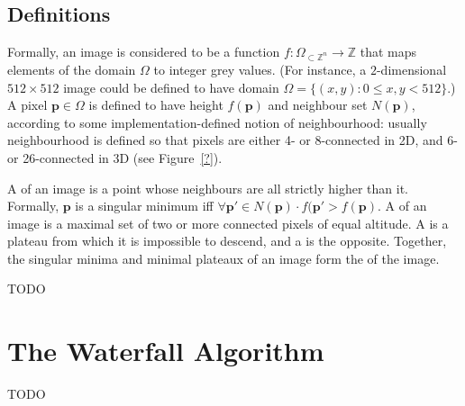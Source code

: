 \subsection{Definitions}

Formally, an image is considered to be a function $f: \Omega_{\subset \mathbb{Z}^n} \to \mathbb{Z}$ that maps elements of the domain $\Omega$ to integer grey values. (For instance, a $2$-dimensional $512 \times 512$ image could be defined to have domain $\Omega = \{(x,y) : 0 \le x,y < 512\}$.) A pixel $\mathbf{p} \in \Omega$ is defined to have height $f(\mathbf{p})$ and neighbour set $N(\mathbf{p})$, according to some implementation-defined notion of neighbourhood: usually neighbourhood is defined so that pixels are either 4- or 8-connected in 2D, and 6- or 26-connected in 3D (see Figure~\ref{?}).


A  of an image is a point whose neighbours are all strictly higher than it. Formally, $\mathbf{p}$ is a singular minimum iff $\forall \mathbf{p'} \in N(\mathbf{p}) \cdot f(\mathbf{p'} > f(\mathbf{p})$. A  of an image is a maximal set of two or more connected pixels of equal altitude. A  is a plateau from which it is impossible to descend, and a  is the opposite. Together, the singular minima and minimal plateaux of an image form the  of the image.

TODO

\section{The Waterfall Algorithm}

TODO
